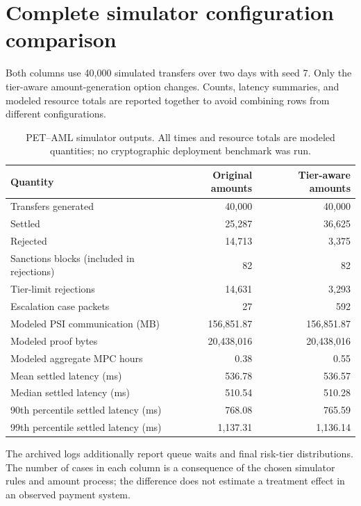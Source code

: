 \documentclass[11pt,a4paper]{article}
\begin{document}
\section{Complete simulator configuration comparison}\label{app:pet}
Both columns use 40,000 simulated transfers over two days with seed 7. Only the tier-aware amount-generation option changes. Counts, latency summaries, and modeled resource totals are reported together to avoid combining rows from different configurations.
\begin{table}[H]\centering\small
\caption{PET--AML simulator outputs. All times and resource totals are modeled quantities; no cryptographic deployment benchmark was run.}
\begin{tabular}{lrr}\toprule Quantity & Original amounts & Tier-aware amounts \\\midrule
Transfers generated & 40,000 & 40,000 \\
Settled & 25,287 & 36,625 \\
Rejected & 14,713 & 3,375 \\
Sanctions blocks (included in rejections) & 82 & 82 \\
Tier-limit rejections & 14,631 & 3,293 \\
Escalation case packets & 27 & 592 \\
Modeled PSI communication (MB) & 156,851.87 & 156,851.87 \\
Modeled proof bytes & 20,438,016 & 20,438,016 \\
Modeled aggregate MPC hours & 0.38 & 0.55 \\
Mean settled latency (ms) & 536.78 & 536.57 \\
Median settled latency (ms) & 510.54 & 510.28 \\
90th percentile settled latency (ms) & 768.08 & 765.59 \\
99th percentile settled latency (ms) & 1,137.31 & 1,136.14 \\\bottomrule\end{tabular}
\end{table}
The archived logs additionally report queue waits and final risk-tier distributions. The number of cases in each column is a consequence of the chosen simulator rules and amount process; the difference does not estimate a treatment effect in an observed payment system.

\makeatletter\g@addto@macro\UrlBreaks{\do\-}\makeatother


\end{document}
